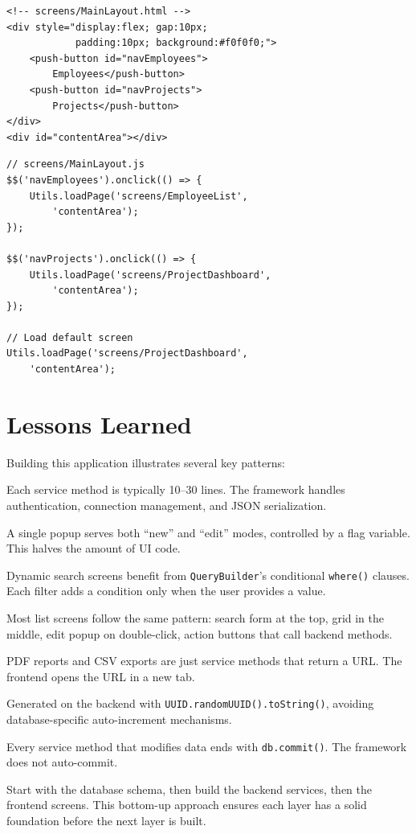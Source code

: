 \begin{lstlisting}[style=html]
<!-- screens/MainLayout.html -->
<div style="display:flex; gap:10px;
            padding:10px; background:#f0f0f0;">
    <push-button id="navEmployees">
        Employees</push-button>
    <push-button id="navProjects">
        Projects</push-button>
</div>
<div id="contentArea"></div>
\end{lstlisting}

\begin{lstlisting}[style=javascript]
// screens/MainLayout.js
$$('navEmployees').onclick(() => {
    Utils.loadPage('screens/EmployeeList',
        'contentArea');
});

$$('navProjects').onclick(() => {
    Utils.loadPage('screens/ProjectDashboard',
        'contentArea');
});

// Load default screen
Utils.loadPage('screens/ProjectDashboard',
    'contentArea');
\end{lstlisting}

\section{Lessons Learned}
\label{sec:app-lessons}

Building this application illustrates several key patterns:

\begin{description}[style=nextline]
  \item[Service simplicity] Each service method is typically 10--30 lines.  The framework handles authentication, connection management, and JSON serialization.

  \item[Popup reuse] A single popup serves both ``new'' and ``edit'' modes, controlled by a flag variable.  This halves the amount of UI code.

  \item[QueryBuilder for search] Dynamic search screens benefit from \texttt{QueryBuilder}'s conditional \texttt{where()} clauses.  Each filter adds a condition only when the user provides a value.

  \item[Grid as the center] Most list screens follow the same pattern: search form at the top, grid in the middle, edit popup on double-click, action buttons that call backend methods.

  \item[Reports are services] PDF reports and CSV exports are just service methods that return a URL.  The frontend opens the URL in a new tab.

  \item[UUID primary keys] Generated on the backend with \texttt{UUID.randomUUID().toString()}, avoiding database-specific auto-increment mechanisms.

  \item[Commit explicitly] Every service method that modifies data ends with \texttt{db.commit()}.  The framework does not auto-commit.
\end{description}

\begin{tipbox}
Start with the database schema, then build the backend services, then the frontend screens.  This bottom-up approach ensures each layer has a solid foundation before the next layer is built.
\end{tipbox}
